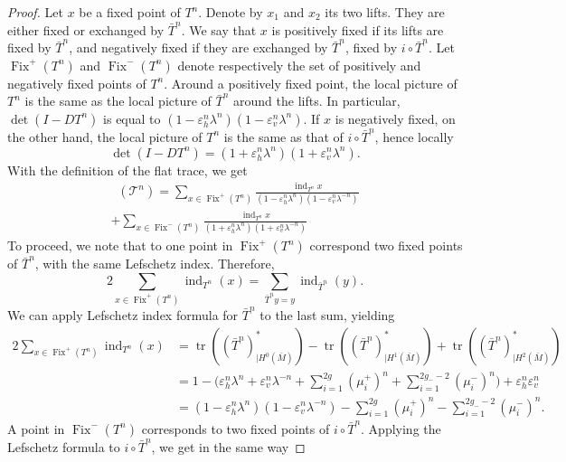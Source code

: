 \documentclass[JEP,XML,SOM,Unicode]{cedram}
\newcommand{\boT}{\mathcal{T}}
\newcommand{\paregg}[1]{\biggl(#1\biggr)}
\newcommand{\restr}{|}
\DeclareMathOperator{\ind}{ind}
\DeclareMathOperator{\Fix}{Fix}
\DeclareMathOperator{\flattr}{\mathrm{tr}^{\flat}}
\DeclareMathOperator{\tr}{tr}
\let\epsilon\varepsilon
\theoremstyle{definition}
\numberwithin{equation}{section}
\begin{document}
\begin{proof}
Let $x$ be a fixed point of $T^n$. Denote by $x_1$ and $x_2$ its two lifts.
They are either fixed or exchanged by $\bar T^n$. We say that $x$ is
positively fixed if its lifts are fixed by $\bar T^n$, and negatively fixed
if they are exchanged by $\bar T^n$, \ie fixed by $i \circ \bar T^n$. Let
$\Fix^+(T^n)$ and $\Fix^-(T^n)$ denote respectively the set of positively and
negatively fixed points of $T^n$. Around a positively fixed point, the local
picture of $T^n$ is the same as the local picture of $\bar T^n$ around the
lifts. In particular, $\det(I-DT^n)$ is equal to $(1-\epsilon_h^n \lambda^n)
(1-\epsilon_v^n \lambda^n)$. If $x$ is negatively fixed, on the other hand,
the local picture of $T^n$ is the same as that of $i \circ \bar T^n$, hence
locally
\[
\det(I-DT^n) = (1+\epsilon_h^n \lambda^n) (1+\epsilon_v^n
\lambda^n).
\]
With the definition of the flat trace, we get
\begin{multline}
\label{eq:wcvlmijmkljwxcvwcx}
\flattr(\boT^n) =
\sum_{x \in \Fix^+(T^n)} \frac{ \ind_{T^n} x}{(1-\epsilon_h^n \lambda^n) (1-\epsilon_v^n \lambda^{-n})}\\[-5pt]
+ \sum_{x \in \Fix^-(T^n)} \frac{ \ind_{T^n} x}{(1+\epsilon_h^n \lambda^n) (1+\epsilon_v^n \lambda^{-n})}
\end{multline}
To proceed, we note that to one point in $\Fix^+(T^n)$ correspond two fixed
points of $\bar T^n$, with the same Lefschetz index. Therefore,
\begin{equation*}
2\sum_{x \in \Fix^+(T^n)} \ind_{T^n}(x) = \sum_{\bar T^n y = y} \ind_{\bar T^n}(y).
\end{equation*}
We can apply Lefschetz index formula for $\bar T^n$ to the last sum, yielding\vspace*{-3pt}
\begin{align*}
2\sum_{x \in \Fix^+(T^n)} \ind_{T^n}(x) & = \tr((\bar T^n)_{\restr H^0(\bar M)}^*) - \tr((\bar T^n)_{\restr H^1(\bar M)}^*) + \tr((\bar T^n)_{\restr H^2(\bar M)}^*)
\\[-7pt]
& = 1 - \paregg{\epsilon_h^n \lambda^n + \epsilon_v^n \lambda^{-n} + \sum_{i=1}^{2g} (\mu_i^+)^n + \sum_{i=1}^{2g_--2} (\mu_i^-)^n } + \epsilon_h^n \epsilon_v^n
\\& = (1-\epsilon_h^n \lambda^n) (1-\epsilon_v^n \lambda^{-n}) - \sum_{i=1}^{2g} (\mu_i^+)^n - \sum_{i=1}^{2g_--2} (\mu_i^-)^n.
\end{align*}
A point in $\Fix^-(T^n)$ corresponds to two fixed points of $i \circ \bar
T^n$. Applying the Lefschetz formula to $i\circ \bar T^n$, we get in the same
way\vspace*{-3pt}

\end{proof}
\end{document}
